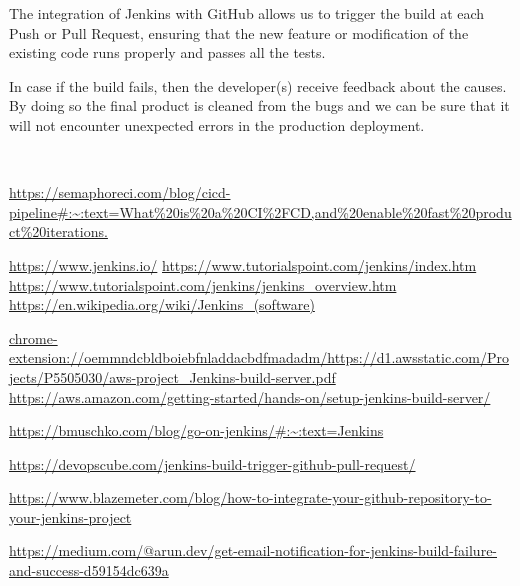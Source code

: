 \documentclass[12pt,a4paper,twoside]{article}
\begin{document}
The integration of Jenkins with GitHub allows us to trigger the build at each Push or Pull Request, ensuring that the new feature or modification of the existing code runs properly and passes all the tests. 

In case if the build fails, then the developer(s) receive feedback about the causes. By doing so the final product is cleaned from the bugs and we can be sure that it will not encounter unexpected errors in the production deployment.


~\newpage


\begin{thebibliography}{100}

	 \url{https://semaphoreci.com/blog/cicd-pipeline#:~:text=What\%20is\%20a\%20CI\%2FCD,and\%20enable\%20fast\%20product\%20iterations.}	

	\bibitem{} \url{https://www.jenkins.io/}
	\bibitem{} \url{https://www.tutorialspoint.com/jenkins/index.htm}
	 \url{https://www.tutorialspoint.com/jenkins/jenkins_overview.htm}
	\bibitem{} \url{https://en.wikipedia.org/wiki/Jenkins_(software)}

	\bibitem{} \url{chrome-extension://oemmndcbldboiebfnladdacbdfmadadm/https://d1.awsstatic.com/Projects/P5505030/aws-project_Jenkins-build-server.pdf}
	 \url{https://aws.amazon.com/getting-started/hands-on/setup-jenkins-build-server/}

	\bibitem{} \url{https://bmuschko.com/blog/go-on-jenkins/#:~:text=Jenkins}

	\bibitem{} \url{https://devopscube.com/jenkins-build-trigger-github-pull-request/}


	\bibitem{} \url{https://www.blazemeter.com/blog/how-to-integrate-your-github-repository-to-your-jenkins-project}

	\bibitem{} \url{https://medium.com/@arun.dev/get-email-notification-for-jenkins-build-failure-and-success-d59154dc639a}

\end{thebibliography}
\end{document}
